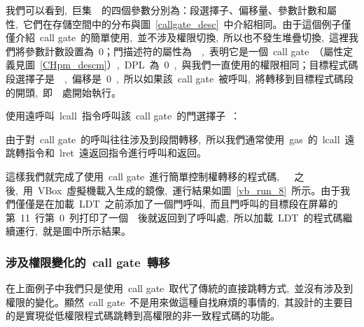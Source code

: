 \label{CHpm_cg_test}

我們可以看到,~巨集~~的四個參數分別為：段選擇子、偏移量、參數計數和屬性,~它們在存儲空間中的分布與圖~\ref{callgate_desc}~中介紹相同。由于這個例子僅僅介紹~call gate~的簡單使用,~並不涉及權限切換,~所以也不發生堆疊切換,~這裡我們將參數計數設置為~0；門描述符的屬性為~~,~表明它是一個~call gate~（屬性定義見圖~\ref{CHpm_descm}）,~DPL~為~0~,~與我們一直使用的權限相同；目標程式碼段選擇子是~~,~偏移是~0~,~所以如果該~call gate~被呼叫,~將轉移到目標程式碼段的開頭,~即~~處開始執行。

使用遠呼叫~lcall~指令呼叫該~call gate~的門選擇子~：

\label{CHpm_cg_call1}

由于對~call gate~的呼叫往往涉及到段間轉移,~所以我們通常使用~gas~的~lcall~遠跳轉指令和~lret~遠返回指令進行呼叫和返回。

這樣我們就完成了使用~call gate~進行簡單控制權轉移的程式碼,~~~之後,~用~VBox~虛擬機載入生成的鏡像,~運行結果如圖~\ref{vb_run_8}~所示。由于我們僅僅是在加載~LDT~之前添加了一個門呼叫,~而且門呼叫的目標段在屏幕的第~11~行第~0~列打印了一個~~後就返回到了呼叫處,~所以加載~LDT~的程式碼繼續運行,~就是圖中所示結果。


\subsubsection{涉及權限變化的~call gate~轉移}

在上面例子中我們只是使用~call gate~取代了傳統的直接跳轉方式,~並沒有涉及到權限的變化。顯然~call gate~不是用來做這種自找麻煩的事情的,~其設計的主要目的是實現從低權限程式碼跳轉到高權限的非一致程式碼的功能。

